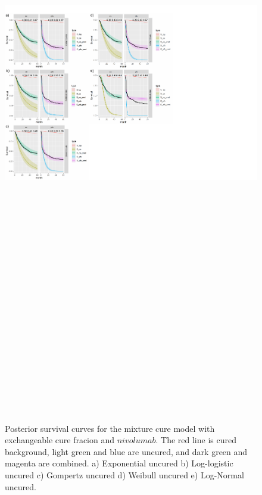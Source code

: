 \documentclass[
]{article}
\begin{document}
\begin{figure}

{\centering \includegraphics[width=25cm,height=40cm]{Check_mate_analysis_files/figure-latex/unnamed-chunk-9-1} 

}

\caption{\label{fig:NIVO}Posterior survival curves for the mixture cure model with exchangeable cure fracion and $nivolumab$. The red line is cured background, light green and blue are uncured, and dark green and magenta are combined. a) Exponential uncured b) Log-logistic uncured c) Gompertz uncured d) Weibull uncured e) Log-Normal uncured.}\label{fig:unnamed-chunk-9}
\end{figure}
\end{document}
